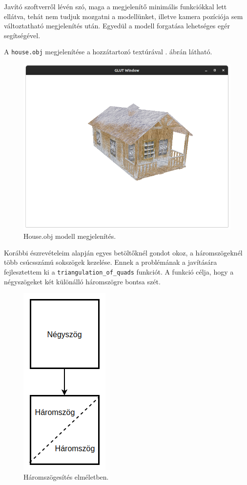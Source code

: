 Javító szoftverről lévén szó, maga a megjelenítő minimális funkciókkal lett ellátva, tehát nem tudjuk mozgatni  a modellünket, illetve kamera pozíciója sem változtatható megjelenítés után. Egyedül a modell forgatása lehetséges egér segítségével.

A \texttt{house.obj} megjelenítése a hozzátartozó textúrával . ábrán látható.
\bigskip

\begin{figure}[h]
\centering
\includegraphics[width=\textwidth]{images/demo.png}
\caption{House.obj modell megjelenítés.}
\label{fig:demo}
\end{figure}



Korábbi észrevételeim alapján egyes betöltőknél gondot okoz, a háromszögeknél több csúcsszámú sokszögek kezelése. Ennek a problémának a javítására fejlesztettem ki a \texttt{triangulation\_of\_quads} funkciót. A funkció célja, hogy a négyszögeket két különálló  háromszögre bontsa szét.

\begin{figure}[h]
\centering
\includegraphics[scale=0.39]{images/triangulation.png}
\caption{Háromszögesítés elméletben.}
\label{fig:tri}
\end{figure}


